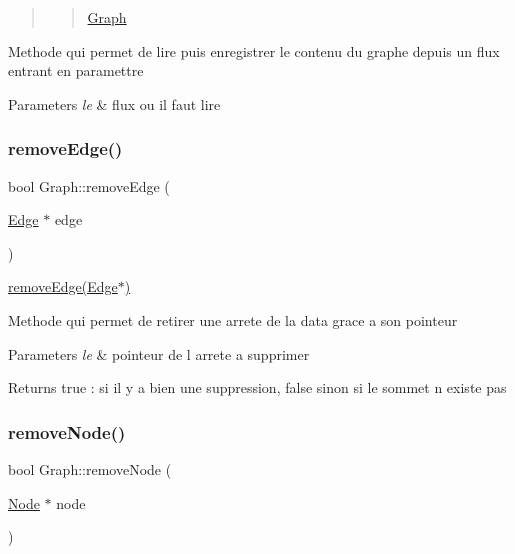\begin{quote}
\begin{quote}
\mbox{\hyperlink{class_graph}{Graph}}\end{quote}
\end{quote}


Methode qui permet de lire puis enregistrer le contenu du graphe depuis un flux entrant en paramettre


\begin{DoxyParams}{Parameters}
{\em le} & flux ou il faut lire \\
\hline
\end{DoxyParams}
\mbox{\label{class_graph_a97b5c94aeef2c0bea6a3f424b0fc01b8}} 
\subsubsection{\texorpdfstring{remove\+Edge()}{removeEdge()}}
{\footnotesize\ttfamily bool Graph\+::remove\+Edge (\begin{DoxyParamCaption}\item[{\mbox{\hyperlink{class_edge}{Edge}} $\ast$}]{edge }\end{DoxyParamCaption})}



\mbox{\hyperlink{class_graph_a97b5c94aeef2c0bea6a3f424b0fc01b8}{remove\+Edge(\+Edge$\ast$)}} 

Methode qui permet de retirer une arrete de la data grace a son pointeur


\begin{DoxyParams}{Parameters}
{\em le} & pointeur de l arrete a supprimer\\
\hline
\end{DoxyParams}
\begin{DoxyReturn}{Returns}
true \+: si il y a bien une suppression, false sinon si le sommet n existe pas 
\end{DoxyReturn}
\mbox{\label{class_graph_a32b254ea9535f8f4ad831d129db525e8}} 
\subsubsection{\texorpdfstring{remove\+Node()}{removeNode()}\hspace{0.1cm}{\footnotesize\ttfamily [1/2]}}
{\footnotesize\ttfamily bool Graph\+::remove\+Node (\begin{DoxyParamCaption}\item[{\mbox{\hyperlink{class_node}{Node}} $\ast$}]{node }\end{DoxyParamCaption})}



